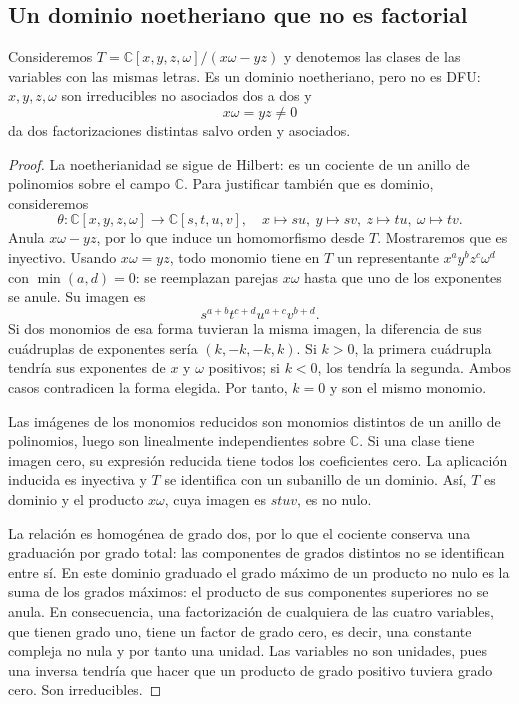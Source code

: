 \subsection{Un dominio noetheriano que no es factorial}
\begin{ejem}\label{ejem:C16-determinante}
Consideremos $T=\mathbb C[x,y,z,\omega]/(x\omega-yz)$ y denotemos las clases de las variables con las mismas letras. Es un dominio noetheriano, pero no es DFU: $x,y,z,\omega$ son irreducibles no asociados dos a dos y
\[
x\omega=yz\ne0
\]
da dos factorizaciones distintas salvo orden y asociados.
\end{ejem}
\begin{proof}
La noetherianidad se sigue de Hilbert: es un cociente de un anillo de polinomios sobre el campo $\mathbb C$. Para justificar también que es dominio, consideremos
\[
\theta:\mathbb C[x,y,z,\omega]\longrightarrow\mathbb C[s,t,u,v],
\quad x\mapsto su,\ y\mapsto sv,\ z\mapsto tu,\ \omega\mapsto tv.
\]
Anula $x\omega-yz$, por lo que induce un homomorfismo desde $T$. Mostraremos que es inyectivo. Usando $x\omega=yz$, todo monomio tiene en $T$ un representante $x^ay^bz^c\omega^d$ con $\min(a,d)=0$: se reemplazan parejas $x\omega$ hasta que uno de los exponentes se anule. Su imagen es
\[
s^{a+b}t^{c+d}u^{a+c}v^{b+d}.
\]
Si dos monomios de esa forma tuvieran la misma imagen, la diferencia de sus cuádruplas de exponentes sería $(k,-k,-k,k)$. Si $k>0$, la primera cuádrupla tendría sus exponentes de $x$ y $\omega$ positivos; si $k<0$, los tendría la segunda. Ambos casos contradicen la forma elegida. Por tanto, $k=0$ y son el mismo monomio.

Las imágenes de los monomios reducidos son monomios distintos de un anillo de polinomios, luego son linealmente independientes sobre $\mathbb C$. Si una clase tiene imagen cero, su expresión reducida tiene todos los coeficientes cero. La aplicación inducida es inyectiva y $T$ se identifica con un subanillo de un dominio. Así, $T$ es dominio y el producto $x\omega$, cuya imagen es $stuv$, es no nulo.

La relación es homogénea de grado dos, por lo que el cociente conserva una graduación por grado total: las componentes de grados distintos no se identifican entre sí. En este dominio graduado el grado máximo de un producto no nulo es la suma de los grados máximos: el producto de sus componentes superiores no se anula. En consecuencia, una factorización de cualquiera de las cuatro variables, que tienen grado uno, tiene un factor de grado cero, es decir, una constante compleja no nula y por tanto una unidad. Las variables no son unidades, pues una inversa tendría que hacer que un producto de grado positivo tuviera grado cero. Son irreducibles.


\end{proof}
